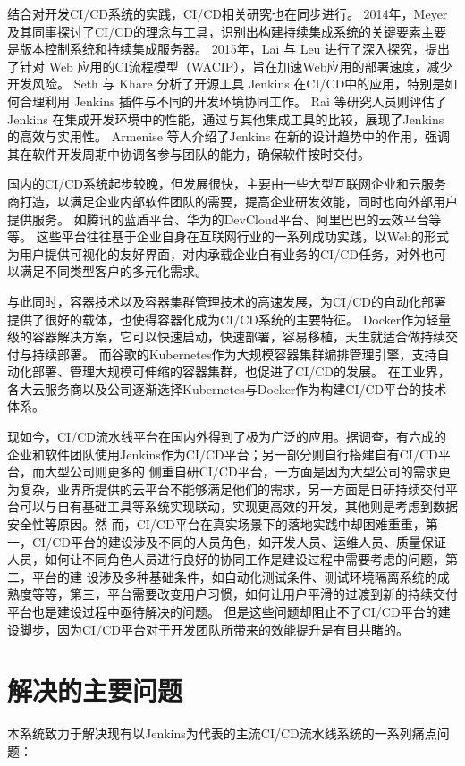 结合对开发CI/CD系统的实践，CI/CD相关研究也在同步进行。
2014年，Meyer 及其同事探讨了CI/CD的理念与工具，识别出构建持续集成系统的关键要素主要是版本控制系统和持续集成服务器\cite{Meyer2014Continuous}。
2015年，Lai 与 Leu 进行了深入探究，提出了针对 Web 应用的CI流程模型（WACIP），旨在加速Web应用的部署速度，减少开发风险\cite{2016Applying}。
Seth 与 Khare 分析了开源工具 Jenkins 在CI/CD中的应用，特别是如何合理利用 Jenkins 插件与不同的开发环境协同工作\cite{7453279}。
Rai 等研究人员则评估了 Jenkins 在集成开发环境中的性能，通过与其他集成工具的比较，展现了Jenkins 的高效与实用性\cite{2015A}。
Armenise 等人介绍了Jenkins 在新的设计趋势中的作用，强调其在软件开发周期中协调各参与团队的能力，确保软件按时交付\cite{2015Continuous}。


国内的CI/CD系统起步较晚，但发展很快，主要由一些大型互联网企业和云服务商打造，以满足企业内部软件团队的需要，提高企业研发效能，同时也向外部用户提供服务。
如腾讯的蓝盾平台、华为的DevCloud平台、阿里巴巴的云效平台等等。
这些平台往往基于企业自身在互联网行业的一系列成功实践，以Web的形式为用户提供可视化的友好界面，对内承载企业自有业务的CI/CD任务，对外也可以满足不同类型客户的多元化需求。

与此同时，容器技术以及容器集群管理技术的高速发展，为CI/CD的自动化部署提供了很好的载体\cite{docker}，也使得容器化成为CI/CD系统的主要特征。
Docker作为轻量级的容器解决方案，它可以快速启动，快速部署，容易移植，天生就适合做持续交付与持续部署。
而谷歌的Kubernetes作为大规模容器集群编排管理引擎，支持自动化部署、管理大规模可伸缩的容器集群，也促进了CI/CD的发展。
在工业界，各大云服务商以及公司逐渐选择Kubernetes与Docker作为构建CI/CD平台的技术体系。

现如今，CI/CD流水线平台在国内外得到了极为广泛的应用。据调查，有六成的企业和软件团队使用Jenkins作为CI/CD平台\cite{DevOps中国调查研究}；另一部分则自行搭建自有CI/CD平台，而大型公司则更多的
侧重自研CI/CD平台，一方面是因为大型公司的需求更为复杂，业界所提供的云平台不能够满足他们的需求，另一方面是自研持续交付平台可以与自有基础工具等系统实现联动，实现更高效的开发，其他则是考虑到数据安全性等原因。然
而，CI/CD平台在真实场景下的落地实践中却困难重重，第一，CI/CD平台的建设涉及不同的人员角色，如开发人员、运维人员、质量保证人员，如何让不同角色人员进行良好的协同工作是建设过程中需要考虑的问题，第二，平台的建
设涉及多种基础条件，如自动化测试条件、测试环境隔离系统的成熟度等等\cite{rangnau2020continuous}，第三，平台需要改变用户习惯，如何让用户平滑的过渡到新的持续交付平台也是建设过程中亟待解决的问题。
但是这些问题却阻止不了CI/CD平台的建设脚步，因为CI/CD平台对于开发团队所带来的效能提升是有目共睹的。

\section{解决的主要问题}
本系统致力于解决现有以Jenkins为代表的主流CI/CD流水线系统的一系列痛点问题：

